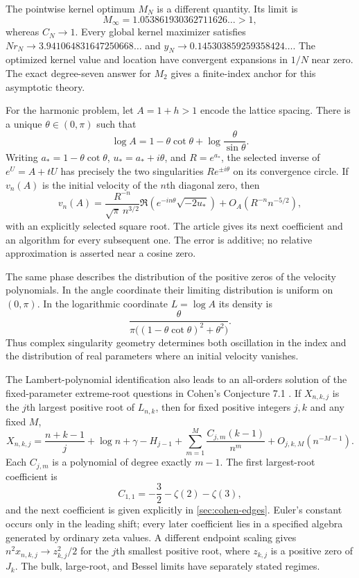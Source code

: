 The pointwise kernel optimum $M_N$ is a different quantity. Its limit is
\[
 M_\infty=1.053861930362711626\ldots>1,
\]
whereas $C_N\to1$. Every global kernel maximizer satisfies
$Nr_N\to3.941064831647250668\ldots$ and
$y_N\to0.145303859259358424\ldots$. The optimized kernel value and
location have convergent expansions in $1/N$ near zero. The exact
degree-seven answer for $M_2$ gives a finite-index anchor for this
asymptotic theory.

For the harmonic problem, let $A=1+h>1$ encode the lattice spacing.
There is a unique $\theta\in(0,\pi)$ such that
\begin{equation}\label{eq:intro-angle}
 \log A=1-\theta\cot\theta+\log\frac\theta{\sin\theta}.
\end{equation}
Writing $a_*=1-\theta\cot\theta$, $u_*=a_*+i\theta$, and
$R=e^{a_*}$, the selected inverse of $e^U=A+tU$ has precisely the
two singularities $Re^{\pm i\theta}$ on its convergence circle.
If $v_n(A)$ is the initial velocity of the $n$th diagonal zero, then
\[
 v_n(A)=\frac{R^{-n}}{\sqrt\pi\,n^{3/2}}
          \Re\!\left(e^{-in\theta}\sqrt{-2u_*}\right)
          +O_A(R^{-n}n^{-5/2}),
\]
with an explicitly selected square root. The article gives its next
coefficient and an algorithm for every subsequent one. The error is
additive; no relative approximation is asserted near a cosine zero.

The same phase describes the distribution of the positive zeros of
the velocity polynomials. In the angle coordinate their limiting
distribution is uniform on $(0,\pi)$. In the logarithmic coordinate
$L=\log A$ its density is
\[
 \frac{\theta}{\pi\bigl((1-\theta\cot\theta)^2+\theta^2\bigr)}.
\]
Thus complex singularity geometry determines both oscillation in the
index and the distribution of real parameters where an initial
velocity vanishes.

The Lambert-polynomial identification also leads to an all-orders
solution of the fixed-parameter extreme-root questions in Cohen's
Conjecture 7.1 \cite{Cohen2021}. If $X_{n,k,j}$ is the $j$th largest
positive root of $L_{n,k}$, then for fixed positive integers $j,k$ and
any fixed $M$,
\begin{equation}\label{eq:intro-Cohen}
 X_{n,k,j}=\frac{n+k-1}{j}+\log n+\gamma-H_{j-1}
       +\sum_{m=1}^{M}\frac{C_{j,m}(k-1)}{n^m}
       +O_{j,k,M}(n^{-M-1}).
\end{equation}
Each $C_{j,m}$ is a polynomial of degree exactly $m-1$. The first
largest-root coefficient is
\[
 C_{1,1}=-\frac32-\zeta(2)-\zeta(3),
\]
and the next coefficient is given explicitly in
\cref{sec:cohen-edges}. Euler's constant occurs only in the leading
shift; every later coefficient lies in a specified algebra generated
by ordinary zeta values. A different endpoint scaling gives
$n^2x_{n,k,j}\to z_{k,j}^2/2$ for the $j$th smallest positive root,
where $z_{k,j}$ is a positive zero of $J_k$. The bulk, large-root,
and Bessel limits have separately stated regimes.

